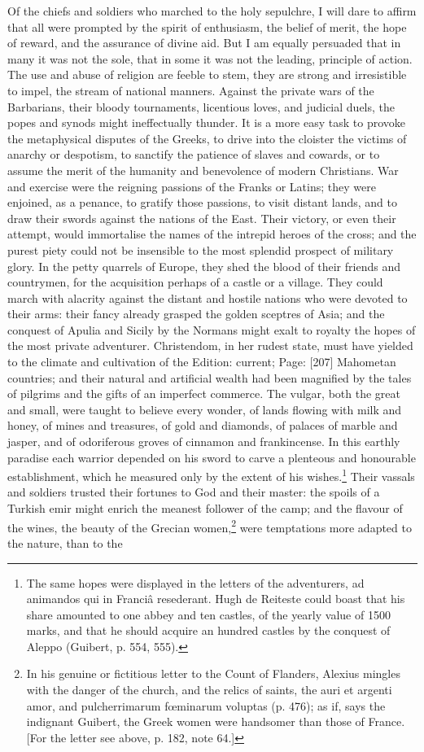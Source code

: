 Of the chiefs and soldiers who marched to the holy sepulchre, I will dare to affirm that all were prompted by the spirit of enthusiasm, the belief of merit, the hope of reward, and the assurance of divine aid. But I am equally persuaded that in many it was not the sole, that in some it was not the leading, principle of action. The use and abuse of religion are feeble to stem, they are strong and irresistible to impel, the stream of national manners. Against the private wars of the Barbarians, their bloody tournaments, licentious loves, and judicial duels, the popes and synods might ineffectually thunder. It is a more easy task to provoke the metaphysical disputes of the Greeks, to drive into the cloister the victims of anarchy or despotism, to sanctify the patience of slaves and cowards, or to assume the merit of the humanity and benevolence of modern Christians. War and exercise were the reigning passions of the Franks or Latins; they were enjoined, as a penance, to gratify those passions, to visit distant lands, and to draw their swords against the nations of the East. Their victory, or even their attempt, would immortalise the names of the intrepid heroes of the cross; and the purest piety could not be insensible to the most splendid prospect of military glory. In the petty quarrels of Europe, they shed the blood of their friends and countrymen, for the acquisition perhaps of a castle or a village. They could march with alacrity against the distant and hostile nations who were devoted to their arms: their fancy already grasped the golden sceptres of Asia; and the conquest of Apulia and Sicily by the Normans might exalt to royalty the hopes of the most private adventurer. Christendom, in her rudest state, must have yielded to the climate and cultivation of the Edition: current; Page: [207] Mahometan countries; and their natural and artificial wealth had been magnified by the tales of pilgrims and the gifts of an imperfect commerce. The vulgar, both the great and small, were taught to believe every wonder, of lands flowing with milk and honey, of mines and treasures, of gold and diamonds, of palaces of marble and jasper, and of odoriferous groves of cinnamon and frankincense. In this earthly paradise each warrior depended on his sword to carve a plenteous and honourable establishment, which he measured only by the extent of his wishes.\footnote{The same hopes were displayed in the letters of the adventurers, ad animandos qui in Franciâ resederant. Hugh de Reiteste could boast that his share amounted to one abbey and ten castles, of the yearly value of 1500 marks, and that he should acquire an hundred castles by the conquest of Aleppo (Guibert, p. 554, 555).} Their vassals and soldiers trusted their fortunes to God and their master: the spoils of a Turkish emir might enrich the meanest follower of the camp; and the flavour of the wines, the beauty of the Grecian women,\footnote{In his genuine or fictitious letter to the Count of Flanders, Alexius mingles with the danger of the church, and the relics of saints, the auri et argenti amor, and pulcherrimarum fœminarum voluptas (p. 476); as if, says the indignant Guibert, the Greek women were handsomer than those of France. [For the letter see above, p. 182, note 64.]} were temptations more adapted to the nature, than to the 